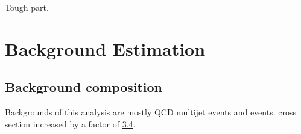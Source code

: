 \begin{savequote}[75mm]
Tough part.
\end{savequote}

\chapter{Background Estimation}

\section{Background composition}
Backgrounds of this analysis are mostly QCD multijet events and \ttbar events. \ttbar cross section increased by a factor of \href{https://cds.cern.ch/record/2227057/files/STDM-2016-02-02.pdf}{3.4}.

